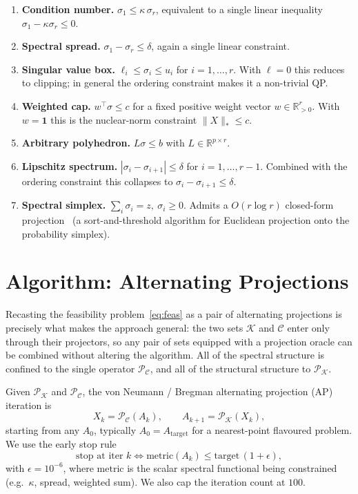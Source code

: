 \documentclass[journal]{IEEEtran}
\newcommand{\R}{\mathbb{R}}
\newcommand{\sgm}{\sigma}
\newcommand{\proj}{\mathcal{P}}
\newcommand{\Kset}{\mathcal{K}}
\newcommand{\Cset}{\mathcal{C}}
\begin{document}
\begin{enumerate}
\item \textbf{Condition number.}
$\sgm_1 \le \kappa \, \sgm_r$, equivalent to a single linear inequality
$\sgm_1 - \kappa \sgm_r \le 0$.

\item \textbf{Spectral spread.}
$\sgm_1 - \sgm_r \le \delta$, again a single linear constraint.

\item \textbf{Singular value box.}
$\ell_i \le \sgm_i \le u_i$ for $i=1,\dots,r$. With $\ell = 0$ this
reduces to clipping; in general the ordering constraint makes it a
non-trivial QP.

\item \textbf{Weighted cap.}
$w^\top \sgm \le c$ for a fixed positive weight vector
$w \in \R^r_{>0}$. With $w = \mathbf{1}$ this is the nuclear-norm
constraint $\|X\|_* \le c$.

\item \textbf{Arbitrary polyhedron.}
$L \sgm \le b$ with $L \in \R^{p\times r}$.

\item \textbf{Lipschitz spectrum.}
$|\sgm_i - \sgm_{i+1}| \le \delta$ for $i=1,\dots,r-1$. Combined with
the ordering constraint this collapses to
$\sgm_i - \sgm_{i+1} \le \delta$.

\item \textbf{Spectral simplex.}
$\sum_i \sgm_i = z,\ \sgm_i \ge 0$. Admits a $O(r\log r)$ closed-form
projection~\cite{simplexproj} (a sort-and-threshold algorithm for
Euclidean projection onto the probability simplex).
\end{enumerate}

\section{Algorithm: Alternating Projections}\label{sec:ap}

Recasting the feasibility problem~\eqref{eq:feas} as a pair of
alternating projections is precisely what makes the approach general:
the two sets $\Kset$ and $\Cset$ enter only through their projectors, so
any pair of sets equipped with a projection oracle can be combined
without altering the algorithm. All of the spectral structure is
confined to the single operator $\proj_\Cset$, and all of the structural
structure to $\proj_\Kset$.

Given $\proj_\Kset$ and $\proj_\Cset$, the von Neumann / Bregman
alternating projection (AP) iteration is
\begin{equation}\label{eq:AP}
X_k = \proj_\Cset(A_k),
\qquad
A_{k+1} = \proj_\Kset(X_k),
\end{equation}
starting from any $A_0$, typically $A_0 = A_{\mathrm{target}}$ for a
nearest-point flavoured problem. We use the early stop rule
\begin{equation}\label{eq:stop}
\text{stop at iter } k \iff \mathrm{metric}(A_k) \le \mathrm{target}\,(1 + \epsilon),
\end{equation}
with $\epsilon = 10^{-6}$, where $\mathrm{metric}$ is the scalar
spectral functional being constrained (e.g.\ $\kappa$, spread,
weighted sum). We also cap the iteration count at $100$.
\end{document}
